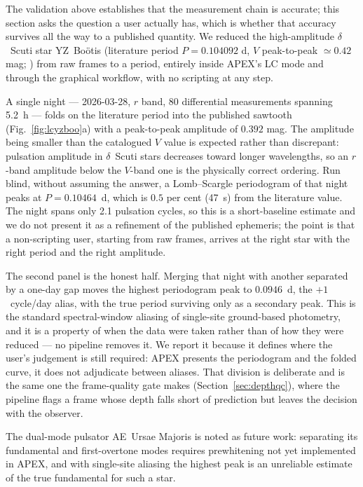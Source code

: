 \documentclass[fleqn,usenatbib]{mnras}
\begin{document}
The validation above establishes that the measurement chain is accurate; this section asks the question a user actually has, which is whether that accuracy survives all the way to a published quantity. We reduced the high-amplitude $\delta$~Scuti star YZ~Bo\"otis (literature period $P = 0.104092$ d, $V$ peak-to-peak $\simeq 0.42$ mag; \citealt{yang2018}) from raw frames to a period, entirely inside APEX's LC mode and through the graphical workflow, with no scripting at any step.

A single night --- 2026-03-28, $r$ band, 80 differential measurements spanning 5.2~h --- folds on the literature period into the published sawtooth (Fig.~\ref{fig:lcyzboo}a) with a peak-to-peak amplitude of $0.392$ mag. The amplitude being smaller than the catalogued $V$ value is expected rather than discrepant: pulsation amplitude in $\delta$~Scuti stars decreases toward longer wavelengths, so an $r$-band amplitude below the $V$-band one is the physically correct ordering. Run blind, without assuming the answer, a Lomb--Scargle periodogram \citep{vanderplas2018} of that night peaks at $P = 0.10464$~d, which is $0.5$ per cent (47~s) from the literature value. The night spans only 2.1 pulsation cycles, so this is a short-baseline estimate and we do not present it as a refinement of the published ephemeris; the point is that a non-scripting user, starting from raw frames, arrives at the right star with the right period and the right amplitude.

The second panel is the honest half. Merging that night with another separated by a one-day gap moves the highest periodogram peak to $0.0946$~d, the $+1$~cycle/day alias, with the true period surviving only as a secondary peak. This is the standard spectral-window aliasing of single-site ground-based photometry, and it is a property of when the data were taken rather than of how they were reduced --- no pipeline removes it. We report it because it defines where the user's judgement is still required: APEX presents the periodogram and the folded curve, it does not adjudicate between aliases. That division is deliberate and is the same one the frame-quality gate makes (Section~\ref{sec:depthqc}), where the pipeline flags a frame whose depth falls short of prediction but leaves the decision with the observer.

The dual-mode pulsator AE~Ursae Majoris \citep{zhou2001, paparo2001} is noted as future work: separating its fundamental and first-overtone modes requires prewhitening not yet implemented in APEX, and with single-site aliasing the highest peak is an unreliable estimate of the true fundamental for such a star.
\end{document}
